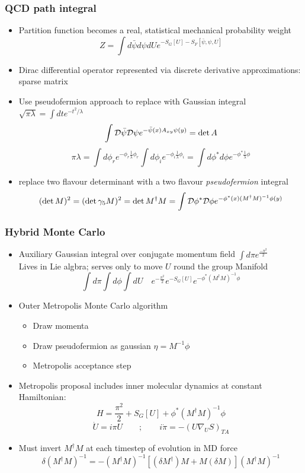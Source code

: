 \documentclass[pdf,ps,8pt]{beamer}
\begin{document}
\begin{frame}[fragile]\small\frametitle{QCD path integral}

\begin{itemize}
\item Partition function becomes a real, statistical mechanical probability weight
  $$Z= \int d\bar\psi d\psi d U e^{-S_G[U]- S_F[\bar\psi,\psi,U]}$$
\item Dirac differential operator represented via discrete derivative approximations: sparse matrix
\item Use pseudofermion approach to replace with Gaussian integral $\sqrt{\pi\lambda} = \int dt e^{-t^2/\lambda}$
$$
\int {\cal D}\bar \psi {\cal D\psi} e^{-\bar\psi(x) A_{xy} \psi(y) } = \det A
$$
$$
\pi \lambda = \int d\phi_r e^{-\phi_r \frac{1}{\lambda}  \phi_r}
              \int d\phi_i e^{-\phi_i \frac{1}{\lambda}  \phi_i} 
              = \int d\phi^\ast d\phi e^{-\phi^\ast \frac{1}{\lambda}  \phi}
$$
\item replace two flavour determinant with a two flavour \emph{pseudofermion} integral
$$
(\det M)^2 = (\det \gamma_5 M)^2 = \det M^\dag M = \int {\cal D}\phi^\ast {\cal D} \phi e^{-\phi^\ast(x) (M^\dag M)^{-1} \phi(y) }
$$
\end{itemize}

\end{frame}

\begin{frame}[fragile]\small\frametitle{Hybrid Monte Carlo}
\begin{itemize}
\item Auxiliary Gaussian integral over conjugate momentum field $\int d\pi e^\frac{-\pi^2}{2}$ \\
  Lives in Lie algbra; serves only to move $U$ round the group Manifold
  $$
  \int d\pi
  \int d \phi
  \int d U \quad
  e^{-\frac{\pi^2}{2}}
  e^{-S_G[U]}
  e^{-\phi^\ast (M^\dag M)^{-1} \phi }
  $$
\item Outer Metropolis Monte Carlo algorithm
  \begin{itemize}
  \item Draw momenta
  \item Draw pseudofermion as gaussian $\eta = M^{-1} \phi$
  \item Metropolis acceptance step
  \end{itemize}
\item Metropolis proposal includes {inner molecular dynamics} at constant Hamiltonian:
  $$
  H= \frac{\pi^2}{2}+S_G[U]+\phi^\ast (M^\dag M)^{-1} \phi
  $$
  $$\dot{U} = i \pi U \quad\quad;\quad\quad i \dot \pi = - ( U \nabla_U S)_{TA}$$
\item {\color{red} Must invert $M^\dagger M$ at each timestep of evolution in MD force }
$$\delta (M^\dag M)^{-1} = -  (M^\dag M)^{-1} [(\delta M^\dag) M + M (\delta M) ] (M^\dag M)^{-1}$$
\end{itemize}
\end{frame}
\end{document}

